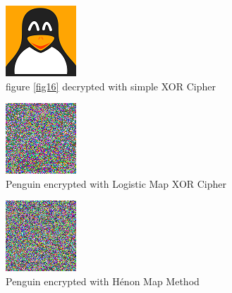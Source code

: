 \documentclass[10pt]{article}
\begin{document}
    
    \begin{figure}[htbp]
    	\centering
    	\includegraphics[width=0.5\columnwidth]{simplePenguinDecrypted.png}
    	\caption{figure \ref{fig16} decrypted with simple XOR Cipher}
    	\label{fig17}
    \end{figure}
    
    
    
    \begin{figure}[htbp]
    	\centering
    	\includegraphics[width=0.5\columnwidth]{LMapStreamPenguinEncrypted.png}
    	\caption{Penguin encrypted with Logistic Map XOR Cipher}
    	\label{fig18}
    \end{figure}
    
    
    \begin{figure}[htbp]
    	\centering
    	\includegraphics[width=0.5\columnwidth]{HenonPenguinEncrypted.png}
    	\caption{Penguin encrypted with Hénon Map Method}
    	\label{fig19}
    \end{figure}
    
\end{document}
